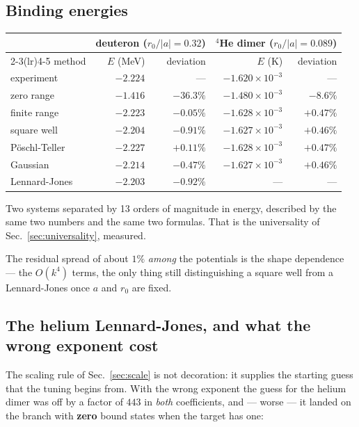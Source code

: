 \documentclass[11pt,a4paper]{article}
\begin{document}
\subsection{Binding energies}

\begin{center}
\begin{tabular}{lrr rr}
\toprule
& \multicolumn{2}{c}{\textbf{deuteron} ($r_0/|a| = 0.32$)}
& \multicolumn{2}{c}{\textbf{$^4$He dimer} ($r_0/|a| = 0.089$)} \\
\cmidrule(lr){2-3}\cmidrule(lr){4-5}
method & $E$ (MeV) & deviation & $E$ (K) & deviation \\
\midrule
experiment        & $-2.224$ & --- & $-1.620\times10^{-3}$ & --- \\
zero range        & $-1.416$ & $-36.3\%$ & $-1.480\times10^{-3}$ & $-8.6\%$ \\
finite range      & $-2.223$ & $-0.05\%$ & $-1.628\times10^{-3}$ & $+0.47\%$ \\
\midrule
square well       & $-2.204$ & $-0.91\%$ & $-1.627\times10^{-3}$ & $+0.46\%$ \\
Pöschl-Teller     & $-2.227$ & $+0.11\%$ & $-1.628\times10^{-3}$ & $+0.47\%$ \\
Gaussian          & $-2.214$ & $-0.47\%$ & $-1.627\times10^{-3}$ & $+0.46\%$ \\
Lennard-Jones     & $-2.203$ & $-0.92\%$ & --- & --- \\
\bottomrule
\end{tabular}
\end{center}

Two systems separated by 13 orders of magnitude in energy, described by the
same two numbers and the same two formulas. That is the universality of
Sec.~\ref{sec:universality}, measured.

The residual spread of about $1\%$ \emph{among} the potentials is the shape
dependence --- the $O(k^4)$ terms, the only thing still distinguishing a square
well from a Lennard-Jones once $a$ and $r_0$ are fixed.

\subsection{The helium Lennard-Jones, and what the wrong exponent cost}
\label{sec:helium-lj}

The scaling rule of Sec.~\ref{sec:scale} is not decoration: it supplies the
starting guess that the tuning begins from. With the wrong exponent the guess
for the helium dimer was off by a factor of $443$ in \emph{both} coefficients,
and --- worse --- it landed on the branch with \textbf{zero} bound states when
the target has one:
\end{document}
